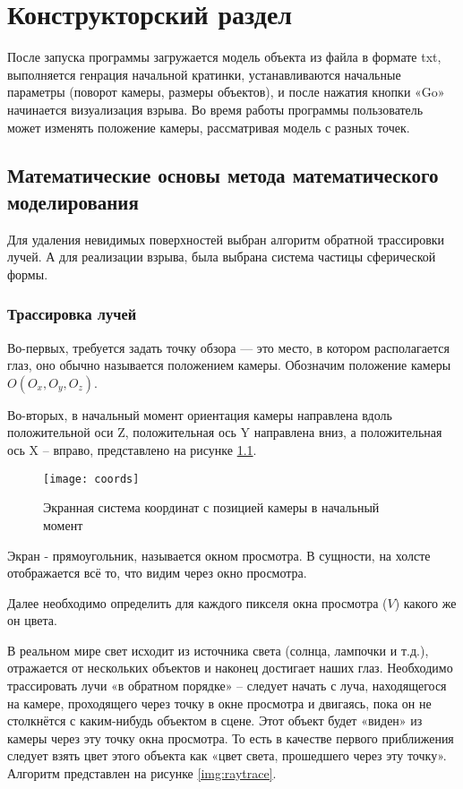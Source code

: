\chapter{\textbf{Конструкторский раздел}}

\hfill

После запуска программы загружается модель объекта из файла в формате txt, выполняется генрация начальной кратинки, устанавливаются начальные параметры (поворот камеры, размеры объектов), и после нажатия кнопки «Go» начинается визуализация взрыва. Во время работы программы пользователь может изменять положение камеры, рассматривая модель с разных точек. 

\section{\textbf{Математические основы метода математического моделирования}}

\hfill

Для удаления невидимых поверхностей выбран алгоритм обратной трассировки лучей. А для реализации взрыва, была выбрана система частицы сферической формы. 

\subsection{\textbf{Трассировка лучей}}

\hfill

Во-первых, требуется задать точку обзора — это место, в котором располагается глаз, оно обычно называется положением камеры. Обозначим положение камеры $O(O_x, O_y, O_z)$. 

Во-вторых, в начальный момент ориентация камеры направлена вдоль положительной оси Z, положительная ось Y направлена вниз, а положительная ось X -- вправо, представлено на рисунке \ref{img:coords}. 

\begin{figure}[H]
	\centering
	\texttt{[image: coords]}
	\caption{Экранная система координат с позицией камеры в начальный момент}
	\label{img:coords}
\end{figure}

Экран - прямоугольник, называется окном просмотра. В сущности, на холсте отображается всё то, что видим через окно просмотра.

Далее необходимо определить для каждого пикселя окна просмотра ($V$) какого же он цвета.

В реальном мире свет исходит из источника света (солнца, лампочки и т.д.), отражается от нескольких объектов и наконец достигает наших глаз. Необходимо трассировать лучи «в обратном порядке» -- следует начать с луча, находящегося на камере, проходящего через точку в окне просмотра и двигаясь, пока он не столкнётся с каким-нибудь объектом в сцене. Этот объект будет «виден» из камеры через эту точку окна просмотра. То есть в качестве первого приближения следует взять цвет этого объекта как «цвет света, прошедшего через эту точку».
Алгоритм представлен на рисунке \ref{img:raytrace}. 

